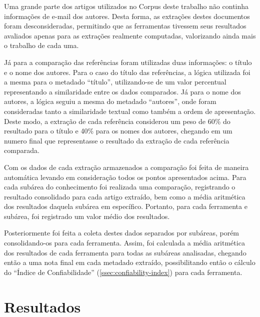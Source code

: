 
Uma grande parte dos artigos utilizados no Corpus deste trabalho não continha informações de e-mail dos autores. Desta forma, as extrações destes documentos foram desconsideradas, permitindo que as ferramentas tivessem seus resultados avaliados apenas para as extrações realmente computadas, valorizando ainda mais o trabalho de cada uma.


Já para a comparação das referências foram utilizadas duas informações: o título e o nome dos autores. Para o caso do título das referências, a lógica utilizada foi a mesma para o metadado ``título'', utilizando-se de um valor percentual representando a similaridade entre os dados comparados. Já para o nome dos autores, a lógica seguiu a mesma do metadado ``autores'', onde foram consideradas tanto a similaridade textual como também a ordem de apresentação. Deste modo, a extração de cada referência considerou um peso de 60\% do resultado para o título e 40\% para os nomes dos autores, chegando em um numero final que representasse o resultado da extração de cada referência comparada.


Com os dados de cada extração armazenados a comparação foi feita de maneira automática levando em consideração todos os pontos apresentados acima. Para cada subárea do conhecimento foi realizada uma comparação, registrando o resultado consolidado para cada artigo extraído, bem como a média aritmética dos resultados daquela subárea em específico. Portanto, para cada ferramenta e subárea, foi registrado um valor médio dos resultados.

Posteriormente foi feita a coleta destes dados separados por subáreas, porém consolidando-os para cada ferramenta. Assim, foi calculada a média aritmética dos resultados de cada ferramenta para todas as subáreas analisadas, chegando então a uma nota final em cada metadado extraído, possibilitando então o cálculo do ``Índice de Confiabilidade'' (\autoref{ssec:confiability-index}) para cada ferramenta.


\section{Resultados}
\label{sec:results}

